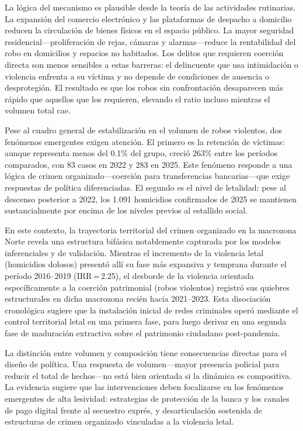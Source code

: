 \documentclass[12pt,a4paper]{article}
\begin{document}
La l\'ogica del mecanismo es plausible desde la teor\'ia de las actividades rutinarias.
La expansi\'on del comercio electr\'onico y las plataformas de despacho a domicilio
reducen la circulaci\'on de bienes f\'isicos en el espacio p\'ublico. La mayor seguridad
residencial---proliferaci\'on de rejas, c\'amaras y alarmas---reduce la rentabilidad del
robo en domicilios y espacios no habitados. Los delitos que requieren coerci\'on directa
son menos sensibles a estas barreras: el delincuente que usa intimidaci\'on o violencia
enfrenta a su v\'ictima y no depende de condiciones de ausencia o desprotegi\'on. El
resultado es que los robos sin confrontaci\'on desaparecen m\'as r\'apido que aquellos
que los requieren, elevando el ratio incluso mientras el volumen total cae.

Pese al cuadro general de estabilizaci\'on en el volumen de robos violentos, dos
fen\'omenos emergentes exigen atenci\'on. El primero es la retenci\'on de
v\'ictimas: aunque representa menos del 0.1\% del grupo, creci\'o 263\% entre los
per\'iodos comparados, con 83 casos en 2022 y 283 en 2025. Este fen\'omeno responde a
una l\'ogica de crimen organizado---coerci\'on para transferencias bancarias---que
exige respuestas de pol\'itica diferenciadas. El segundo es el nivel de letalidad:
pese al descenso posterior a 2022, los 1.091 homicidios confirmados de 2025
se mantienen sustancialmente por encima de los niveles previos al estallido social.

En este contexto, la trayectoria territorial del crimen organizado en la macrozona Norte
revela una estructura bif\'asica notablemente capturada por los modelos inferenciales y de validaci\'on.
Mientras el incremento de la violencia letal (homicidios dolosos) present\'o all\'i su
fase m\'as expansiva y temprana durante el per\'iodo 2016--2019 (IRR\,=\,2.25), el desborde
de la violencia orientada espec\'ificamente a la coerci\'on patrimonial (robos violentos)
registr\'o sus quiebres estructurales en dicha macrozona reci\'en hacia 2021--2023. Esta
disociaci\'on cronol\'ogica sugiere que la instalaci\'on inicial de redes criminales oper\'o
mediante el control territorial letal en una primera fase, para luego derivar en una
segunda fase de maduraci\'on extractiva sobre el patrimonio ciudadano post-pandemia.

La distinci\'on entre volumen y composici\'on tiene consecuencias directas para el
dise\~no de pol\'itica. Una respuesta de volumen---mayor presencia policial para reducir
el total de hechos---no est\'a bien orientada si la din\'amica es compositiva. La
evidencia sugiere que las intervenciones deben focalizarse en los fen\'omenos emergentes
de alta lesividad: estrategias de protecci\'on de la banca y los canales de pago digital
frente al secuestro expr\'es, y desarticulaci\'on sostenida de estructuras de crimen
organizado vinculadas a la violencia letal.
\end{document}
